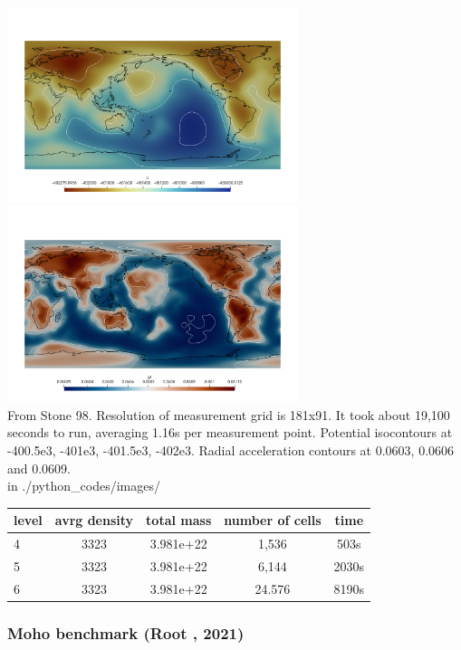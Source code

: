 \begin{center}
\includegraphics[width=8.5cm]{python_codes/fieldstone_98/images/U}
\includegraphics[width=8.5cm]{python_codes/fieldstone_98/images/gr}\\
{\captionfont From Stone 98. Resolution of measurement grid is 181x91. It took 
about 19,100 seconds to run, averaging 1.16s per measurement point.  
Potential isocontours at -400.5e3, -401e3, -401.5e3, -402e3. 
Radial acceleration contours at 0.0603, 0.0606 and 0.0609.\\
{\tiny {\color{gray} in ./python\_codes/images/}}
}
\end{center}

\begin{tabular}{lcccc}
\hline
level & avrg density & total mass & number of cells & time \\
\hline
\hline
4     & 3323  & 3.981e+22 & 1,536  & 503s  \\
5     & 3323  & 3.981e+22 & 6,144  & 2030s \\
6     & 3323  & 3.981e+22 & 24.576 & 8190s \\
\hline
\end{tabular}

\newpage
\subsubsection{Moho benchmark (Root \etal, 2021)}

